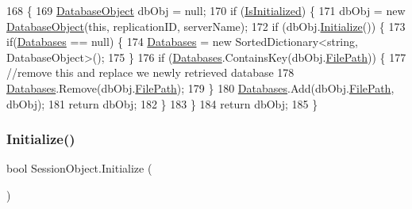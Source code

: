 \begin{DoxyCode}
168                                                                                    \{
169         \mbox{\hyperlink{class_database_object}{DatabaseObject}} dbObj = null;
170         \textcolor{keywordflow}{if} (\mbox{\hyperlink{class_session_object_ae0885b9054fc3ce287307ac16ff69990}{IsInitialized}}) \{
171             dbObj = \textcolor{keyword}{new} \mbox{\hyperlink{class_database_object}{DatabaseObject}}(\textcolor{keyword}{this}, replicationID, serverName);
172             \textcolor{keywordflow}{if} (dbObj.\mbox{\hyperlink{class_database_object_a7de43a21bd287deec537cffec343f41d}{Initialize}}()) \{
173                 \textcolor{keywordflow}{if}(\mbox{\hyperlink{class_session_object_aa0b75f5b9d0a6325f436e08db27204a2}{Databases}} == null) \{
174                     \mbox{\hyperlink{class_session_object_aa0b75f5b9d0a6325f436e08db27204a2}{Databases}} = \textcolor{keyword}{new} SortedDictionary<string, DatabaseObject>();
175                 \}
176                 \textcolor{keywordflow}{if} (\mbox{\hyperlink{class_session_object_aa0b75f5b9d0a6325f436e08db27204a2}{Databases}}.ContainsKey(dbObj.\mbox{\hyperlink{class_database_object_a38a1a78430c6cd1fc4eef054e39145ce}{FilePath}})) \{
177                     \textcolor{comment}{//remove this and replace we newly retrieved database}
178                     \mbox{\hyperlink{class_session_object_aa0b75f5b9d0a6325f436e08db27204a2}{Databases}}.Remove(dbObj.\mbox{\hyperlink{class_database_object_a38a1a78430c6cd1fc4eef054e39145ce}{FilePath}});
179                 \}
180                 \mbox{\hyperlink{class_session_object_aa0b75f5b9d0a6325f436e08db27204a2}{Databases}}.Add(dbObj.\mbox{\hyperlink{class_database_object_a38a1a78430c6cd1fc4eef054e39145ce}{FilePath}}, dbObj);
181                 \textcolor{keywordflow}{return} dbObj;
182             \}
183         \}
184         \textcolor{keywordflow}{return} dbObj;
185     \}
\end{DoxyCode}
\mbox{\label{class_session_object_af3b9c9d56d98c848061952ed935f815b}} 
\subsubsection{\texorpdfstring{Initialize()}{Initialize()}}
{\footnotesize\ttfamily bool Session\+Object.\+Initialize (\begin{DoxyParamCaption}{ }\end{DoxyParamCaption})}



